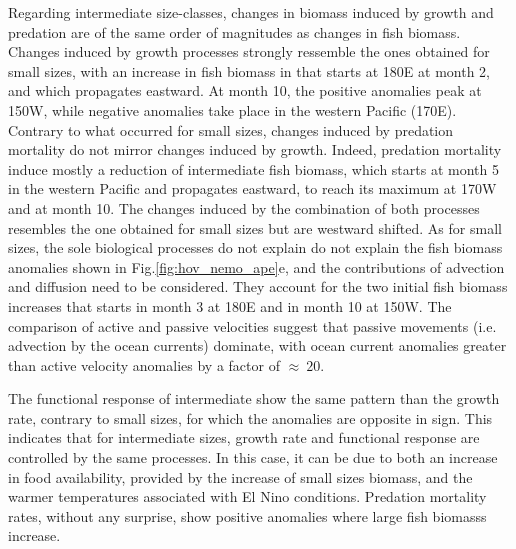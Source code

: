Regarding intermediate size-classes, changes in biomass induced by growth and predation are of the same order of magnitudes as changes in fish biomass. Changes induced by growth processes strongly ressemble the ones obtained for small sizes, with an increase in fish biomass in that starts at 180\degree{}E at month 2, and which propagates eastward. At month 10, the positive anomalies peak at 150\degree{}W, while negative anomalies take place in the western Pacific (170\degree{}E). Contrary to what occurred for small sizes, changes induced by predation mortality do not mirror changes induced by growth. Indeed, predation mortality induce mostly a reduction of intermediate fish biomass, which starts at month 5 in the western Pacific and propagates eastward, to reach its maximum at 170\degree{}W and at month 10. The changes induced by the combination of both processes resembles the one obtained for small sizes but are westward shifted. As for small sizes, the sole biological processes do not explain do not explain the fish biomass anomalies shown in Fig.\ref{fig:hov_nemo_ape}e, and the contributions of advection and diffusion need to be considered. They account for the two initial fish biomass increases that starts in month 3 at 180\degree{}E and in month 10 at 150\degree{}W. The comparison of active and passive velocities suggest that passive movements (i.e. advection by the ocean currents) dominate, with ocean current anomalies greater than active velocity anomalies by a factor of $\approx\ 20$.

The functional response of intermediate show the same pattern than the growth rate, contrary to small sizes, for which the anomalies are opposite in sign. This indicates that for intermediate sizes, growth rate and functional response are controlled by the same processes. In this case, it can be due to both an increase in food availability, provided by the increase of small sizes biomass, and the warmer temperatures associated with El Nino conditions. Predation mortality rates, without any surprise, show positive anomalies where large fish biomasss increase.

